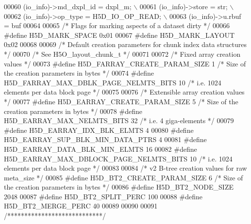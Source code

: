 \begin{DoxyCode}
00060 \textcolor{preprocessor}{    (io\_info)->md\_dxpl\_id = dxpl\_m;                                     \(\backslash\)}
00061 \textcolor{preprocessor}{    (io\_info)->store = str;                                             \(\backslash\)}
00062 \textcolor{preprocessor}{    (io\_info)->op\_type = H5D\_IO\_OP\_READ;                                \(\backslash\)}
00063 \textcolor{preprocessor}{    (io\_info)->u.rbuf = buf}
00064 
00065 \textcolor{comment}{/* Flags for marking aspects of a dataset dirty */}
00066 \textcolor{preprocessor}{#define H5D\_MARK\_SPACE  0x01}
00067 \textcolor{preprocessor}{#define H5D\_MARK\_LAYOUT  0x02}
00068 
00069 \textcolor{comment}{/* Default creation parameters for chunk index data structures */}
00070 \textcolor{comment}{/* See H5O\_layout\_chunk\_t */}
00071 
00072 \textcolor{comment}{/* Fixed array creation values */}
00073 \textcolor{preprocessor}{#define H5D\_FARRAY\_CREATE\_PARAM\_SIZE        1   }\textcolor{comment}{/* Size of the creation parameters in bytes */}\textcolor{preprocessor}{}
00074 \textcolor{preprocessor}{#define H5D\_FARRAY\_MAX\_DBLK\_PAGE\_NELMTS\_BITS    10      }\textcolor{comment}{/* i.e. 1024 elements per data block page */}\textcolor{preprocessor}{}
00075 
00076 \textcolor{comment}{/* Extensible array creation values */}
00077 \textcolor{preprocessor}{#define H5D\_EARRAY\_CREATE\_PARAM\_SIZE        5   }\textcolor{comment}{/* Size of the creation parameters in bytes */}\textcolor{preprocessor}{}
00078 \textcolor{preprocessor}{#define H5D\_EARRAY\_MAX\_NELMTS\_BITS          32  }\textcolor{comment}{/* i.e. 4 giga-elements */}\textcolor{preprocessor}{}
00079 \textcolor{preprocessor}{#define H5D\_EARRAY\_IDX\_BLK\_ELMTS            4}
00080 \textcolor{preprocessor}{#define H5D\_EARRAY\_SUP\_BLK\_MIN\_DATA\_PTRS    4}
00081 \textcolor{preprocessor}{#define H5D\_EARRAY\_DATA\_BLK\_MIN\_ELMTS       16}
00082 \textcolor{preprocessor}{#define H5D\_EARRAY\_MAX\_DBLOCK\_PAGE\_NELMTS\_BITS  10  }\textcolor{comment}{/* i.e. 1024 elements per data block page */}\textcolor{preprocessor}{}
00083 
00084 \textcolor{comment}{/* v2 B-tree creation values for raw meta\_size */}
00085 \textcolor{preprocessor}{#define H5D\_BT2\_CREATE\_PARAM\_SIZE   6       }\textcolor{comment}{/* Size of the creation parameters in bytes */}\textcolor{preprocessor}{}
00086 \textcolor{preprocessor}{#define H5D\_BT2\_NODE\_SIZE           2048}
00087 \textcolor{preprocessor}{#define H5D\_BT2\_SPLIT\_PERC          100}
00088 \textcolor{preprocessor}{#define H5D\_BT2\_MERGE\_PERC          40}
00089 
00090 
00091 \textcolor{comment}{/****************************/}

\end{DoxyCode}
